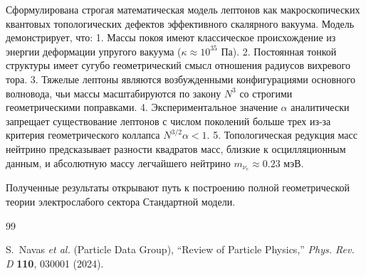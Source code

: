 \documentclass[12pt,a4paper]{article}
\begin{document}
Сформулирована строгая математическая модель лептонов как макроскопических квантовых топологических дефектов эффективного скалярного вакуума. Модель демонстрирует, что:
1. Массы покоя имеют классическое происхождение из энергии деформации упругого вакуума ($\kappa \approx 10^{35}$ Па).
2. Постоянная тонкой структуры имеет сугубо геометрический смысл отношения радиусов вихревого тора.
3. Тяжелые лептоны являются возбужденными конфигурациями основного волновода, чьи массы масштабируются по закону $N^3$ со строгими геометрическими поправками.
4. Экспериментальное значение $\alpha$ аналитически запрещает существование лептонов с числом поколений больше трех из-за критерия геометрического коллапса $N^{3/2} \alpha < 1$.
5. Топологическая редукция масс нейтрино предсказывает разности квадратов масс, близкие к осцилляционным данным, и абсолютную массу легчайшего нейтрино $m_{\nu_e} \approx 0.23$ мэВ.

Полученные результаты открывают путь к построению полной геометрической теории электрослабого сектора Стандартной модели.

\begin{thebibliography}{99}

S.~Navas \textit{et al.} (Particle Data Group), ``Review of Particle Physics,'' \textit{Phys. Rev. D} \textbf{110}, 030001 (2024).

\end{thebibliography}
\end{document}

